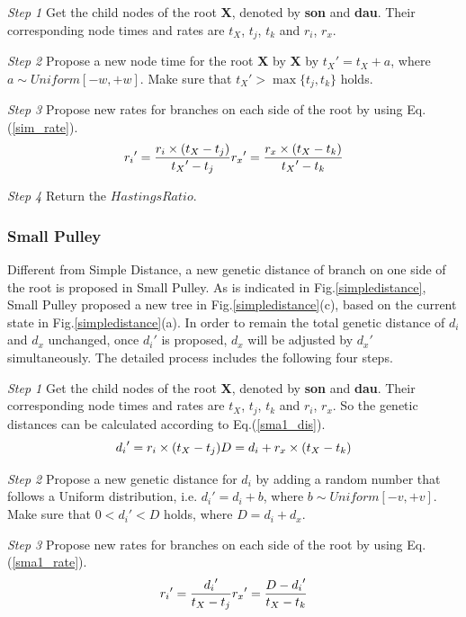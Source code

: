 \documentclass{bmcart}
\begin{document}
\emph{Step 1} Get the child nodes of the root \textbf{X}, denoted by \textbf{son} and \textbf{dau}. Their corresponding node times and rates are $t_X$, $t_j$, $t_k$ and $r_i$, $r_x$.

\emph{Step 2} Propose a new node time for the root \textbf{X} by \textbf{X} by ${t_X}' = {t_X} + a$, where $a \sim Uniform[ - w, + w]$. Make sure that ${t_X}' > \max \{ {t_j},{t_k}\} $ holds.

\emph{Step 3} Propose new rates for branches on each side of the root by using Eq.(\ref{sim_rate}).
\begin{equation}
\label{sim_rate}
{r_i}' = \frac{{{r_i} \times ({{t_X} - {t_j}})}}{{{t_X}' - {t_j}}}\\
{r_x}' = \frac{{{r_x} \times ({{t_X} - {t_k}})}}{{{t_X}' - {t_k}}}
 \end{equation}

\emph{Step 4} Return the $HastingsRatio$.
\subsubsection*{Small Pulley}
Different from Simple Distance, a new genetic distance of branch on one side of the root is proposed in Small Pulley. As is indicated in Fig.\ref{simpledistance}, Small Pulley proposed a new tree in Fig.\ref{simpledistance}(c), based on the current state in Fig.\ref{simpledistance}(a). In order to remain the total genetic distance of $d_i$ and $d_x$ unchanged, once ${d_i}'$ is proposed, $d_x$ will be adjusted by ${d_x}'$ simultaneously. The detailed process includes the following four steps.

\emph{Step 1} Get the child nodes of the root \textbf{X}, denoted by \textbf{son} and \textbf{dau}. Their corresponding node times and rates are $t_X$, $t_j$, $t_k$ and $r_i$, $r_x$. So the genetic distances can be calculated according to Eq.(\ref{sma1_dis}).
\begin{equation}
\label{sma1_dis}
{d_i}' = {r_i} \times ({{t_X} - {t_j}})\\
D = {d_i} + {r_x} \times ({{t_X} - {t_k}})
 \end{equation}

\emph{Step 2} Propose a new genetic distance for $d_i$ by adding a random number that follows a Uniform distribution, i.e.  ${d_i}' = {d_i} + b$, where $b \sim Uniform[ - v, + v]$. Make sure that $0 < {d_i}' < D$ holds, where $D = {d_i} + {d_x}$.

\emph{Step 3} Propose new rates for branches on each side of the root by using Eq.(\ref{sma1_rate}).
\begin{equation}
\label{sma1_rate}
{r_i}' = \frac{{{d_i}'}}{{{t_X} - {t_j}}}\\
{r_x}' = \frac{{D - {d_i}'}}{{{t_X} - {t_k}}}
 \end{equation}
\end{document}
